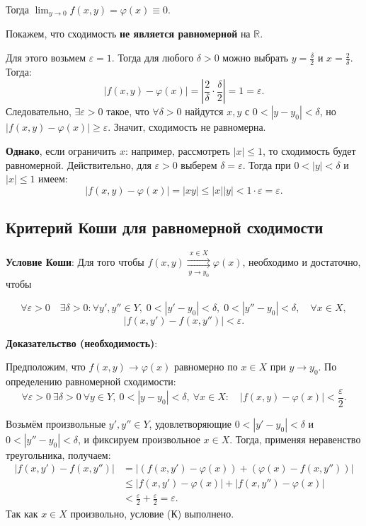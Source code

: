 \documentclass{article}
\begin{document}
Тогда $\lim_{y \to 0} f(x, y) = \varphi(x) \equiv 0$.

Покажем, что сходимость \textbf{не является равномерной} на $\mathbb{R}$.

Для этого возьмем $\varepsilon = 1$. Тогда для любого $\delta > 0$ можно выбрать $y = \frac{\delta}{2}$ и $x = \frac{2}{\delta}$. Тогда:
\[
|f(x, y) - \varphi(x)| = \left| \frac{2}{\delta} \cdot \frac{\delta}{2} \right| = 1 = \varepsilon.
\]
Следовательно, $\exists \varepsilon > 0$ такое, что $\forall \delta > 0$ найдутся $x, y$ с $0 < |y - y_0| < \delta$, но $|f(x, y) - \varphi(x)| \geq \varepsilon$. Значит, сходимость не равномерна.

\textbf{Однако}, если ограничить $x$: например, рассмотреть $|x| \leq 1$, то сходимость будет равномерной. Действительно, для $\varepsilon > 0$ выберем $\delta = \varepsilon$. Тогда при $0 < |y| < \delta$ и $|x| \leq 1$ имеем:
\[
|f(x, y) - \varphi(x)| = |xy| \leq |x||y| < 1 \cdot \varepsilon = \varepsilon.
\]

\subsection*{Критерий Коши для равномерной сходимости}

\textbf{Условие Коши}: Для того чтобы \quad $f(x, y) \mathop{\rightrightarrows}\limits^{x \in X}_{\,y \to y_0\,} \varphi(x)$, необходимо и достаточно, чтобы

\[
\boxed{\forall \varepsilon > 0 \quad \exists \delta > 0 : \forall y', y'' \in Y, \; 0 < |y' - y_0| < \delta, \; 0 < |y'' - y_0| < \delta, \quad \forall x \in X,}
\]
\[
\boxed{|f(x, y') - f(x, y'')| < \varepsilon.}
\]

\textbf{Доказательство (необходимость)}:

Предположим, что $f(x, y) \to \varphi(x)$ равномерно по $x \in X$ при $y \to y_0$.  
По определению равномерной сходимости:
\[
\forall \varepsilon > 0\ \exists \delta > 0\ \forall y \in Y,\ 0 < |y - y_0| < \delta,\ \forall x \in X:\quad 
|f(x, y) - \varphi(x)| < \frac{\varepsilon}{2}.
\tag{1}
\]

Возьмём произвольные $y', y'' \in Y$, удовлетворяющие $0 < |y' - y_0| < \delta$ и $0 < |y'' - y_0| < \delta$, и фиксируем произвольное $x \in X$.  
Тогда, применяя неравенство треугольника, получаем:
\[
\begin{aligned}
|f(x, y') - f(x, y'')|
&= \bigl| (f(x, y') - \varphi(x)) + (\varphi(x) - f(x, y'')) \bigr| \\
&\le |f(x, y') - \varphi(x)| + |f(x, y'') - \varphi(x)| \\
&< \frac{\varepsilon}{2} + \frac{\varepsilon}{2} = \varepsilon.
\end{aligned}
\]
Так как $x \in X$ произвольно, условие (К) выполнено.
\end{document}
